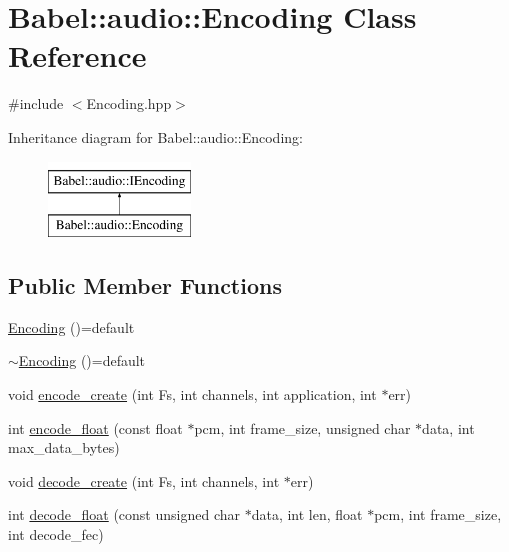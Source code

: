 \hypertarget{classBabel_1_1audio_1_1Encoding}{}\section{Babel\+:\+:audio\+:\+:Encoding Class Reference}
\label{classBabel_1_1audio_1_1Encoding}


{\ttfamily \#include $<$Encoding.\+hpp$>$}

Inheritance diagram for Babel\+:\+:audio\+:\+:Encoding\+:\begin{figure}[H]
\begin{center}
\leavevmode
\includegraphics[height=2.000000cm]{classBabel_1_1audio_1_1Encoding}
\end{center}
\end{figure}
\subsection*{Public Member Functions}
\begin{DoxyCompactItemize}
\item 
\hyperlink{classBabel_1_1audio_1_1Encoding_a2b494c5930fab88efb752c8eee1cc54d}{Encoding} ()=default
\item 
\hyperlink{classBabel_1_1audio_1_1Encoding_a8a577613aa9d57b24074d70dfd045433}{$\sim$\+Encoding} ()=default
\item 
void \hyperlink{classBabel_1_1audio_1_1Encoding_af3f5844d5d36d9abf85c9a3d7c56b3b4}{encode\+\_\+create} (int Fs, int channels, int application, int $\ast$err)
\item 
int \hyperlink{classBabel_1_1audio_1_1Encoding_ae6c38c4a005822b519f4f819e5fcb9ff}{encode\+\_\+float} (const float $\ast$pcm, int frame\+\_\+size, unsigned char $\ast$data, int max\+\_\+data\+\_\+bytes)
\item 
void \hyperlink{classBabel_1_1audio_1_1Encoding_add816037f2047989da7e72ebad6d7ab1}{decode\+\_\+create} (int Fs, int channels, int $\ast$err)
\item 
int \hyperlink{classBabel_1_1audio_1_1Encoding_aaeab672c025f3859ba695726d6c27353}{decode\+\_\+float} (const unsigned char $\ast$data, int len, float $\ast$pcm, int frame\+\_\+size, int decode\+\_\+fec)
\end{DoxyCompactItemize}


